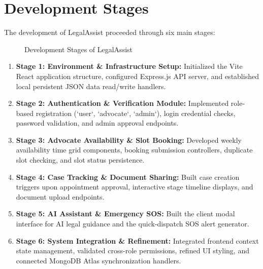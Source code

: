 \documentclass[12pt,a4paper]{report}
\begin{document}
\section{Development Stages}
The development of LegalAssist proceeded through six main stages:

\begin{figure}[h!]
    \centering
    \caption{Development Stages of LegalAssist}
    \label{fig:dev_stages}
\end{figure}

\begin{enumerate}
    \item \textbf{Stage 1: Environment \& Infrastructure Setup:} Initialized the Vite React application structure, configured Express.js API server, and established local persistent JSON data read/write handlers.
    \item \textbf{Stage 2: Authentication \& Verification Module:} Implemented role-based registration (`user`, `advocate`, `admin`), login credential checks, password validation, and admin approval endpoints.
    \item \textbf{Stage 3: Advocate Availability \& Slot Booking:} Developed weekly availability time grid components, booking submission controllers, duplicate slot checking, and slot status persistence.
    \item \textbf{Stage 4: Case Tracking \& Document Sharing:} Built case creation triggers upon appointment approval, interactive stage timeline displays, and document upload endpoints.
    \item \textbf{Stage 5: AI Assistant \& Emergency SOS:} Built the client modal interface for AI legal guidance and the quick-dispatch SOS alert generator.
    \item \textbf{Stage 6: System Integration \& Refinement:} Integrated frontend context state management, validated cross-role permissions, refined UI styling, and connected MongoDB Atlas synchronization handlers.
\end{enumerate}
\end{document}
